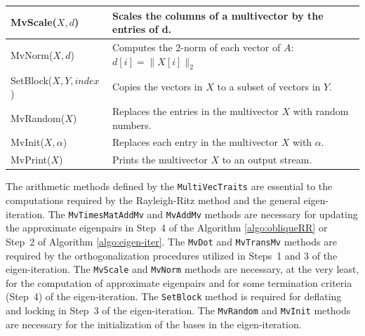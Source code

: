 \documentclass[acmtoms]{acmtrans2m}
\newcommand{\aspace}[1]{\texttt{#1}}
\begin{document}
\begin{table}
\begin{center}
\begin{tabular}{| p{4cm} | p{8cm} |}
MvScale($X,d$)    & Scales the columns of a multivector by the entries
of d. \\\hline

MvNorm($X,d$)     & Computes the 2-norm of each vector of
$A$: $d[i] = \|X[i]\|_2$  \\\hline

SetBlock($X,Y,index$) & Copies the vectors in $X$ to a subset of vectors in
$Y$. \\\hline

MvRandom($X$) & Replaces the entries in the multivector $X$ with random
numbers.  \\\hline

MvInit($X,\alpha$) & Replaces each entry in the multivector $X$ with $\alpha$.
\\\hline

MvPrint($X$)    & Prints the multivector $X$ to an output stream.
\\\hline 
\end{tabular}
\end{center}
\end{table}

The arithmetic methods defined by the \aspace{MultiVecTraits} are essential to the computations
required by the Rayleigh-Ritz method and the general eigen-iteration.  The 
\aspace{MvTimesMatAddMv} and \aspace{MvAddMv} methods are necessary for updating the approximate 
eigenpairs 
in Step~4 of the Algorithm \ref{algo:obliqueRR}
or Step~2 of Algorithm \ref{algo:eigen-iter}.
The \aspace{MvDot} and \aspace{MvTransMv} methods are required by the orthogonalization procedures
utilized in Steps~1 and 3 of the eigen-iteration.  The \aspace{MvScale} and \aspace{MvNorm}
methods are necessary, at the very least, for the computation of approximate eigenpairs and for  
some termination criteria (Step~4) of the eigen-iteration. 
The \aspace{SetBlock} method is required for deflating and locking
in Step~3 of the eigen-iteration. The \aspace{MvRandom} and \aspace{MvInit} methods are necessary
for the initialization of the bases in the eigen-iteration. 
\end{document}
